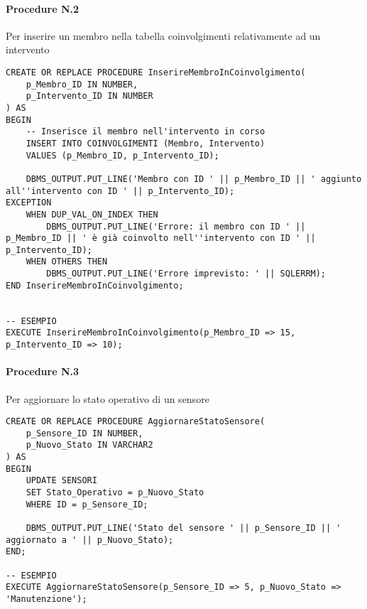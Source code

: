 \paragraph{Procedure N.2} Per inserire un membro nella tabella coinvolgimenti relativamente ad un intervento
\begin{lstlisting}
CREATE OR REPLACE PROCEDURE InserireMembroInCoinvolgimento(
    p_Membro_ID IN NUMBER,
    p_Intervento_ID IN NUMBER
) AS
BEGIN
    -- Inserisce il membro nell'intervento in corso
    INSERT INTO COINVOLGIMENTI (Membro, Intervento)
    VALUES (p_Membro_ID, p_Intervento_ID);
    
    DBMS_OUTPUT.PUT_LINE('Membro con ID ' || p_Membro_ID || ' aggiunto all''intervento con ID ' || p_Intervento_ID);
EXCEPTION
    WHEN DUP_VAL_ON_INDEX THEN
        DBMS_OUTPUT.PUT_LINE('Errore: il membro con ID ' || p_Membro_ID || ' è già coinvolto nell''intervento con ID ' || p_Intervento_ID);
    WHEN OTHERS THEN
        DBMS_OUTPUT.PUT_LINE('Errore imprevisto: ' || SQLERRM);
END InserireMembroInCoinvolgimento;


-- ESEMPIO
EXECUTE InserireMembroInCoinvolgimento(p_Membro_ID => 15, p_Intervento_ID => 10);    
\end{lstlisting} 
\vspace{1cm}

\paragraph{Procedure N.3} Per aggiornare lo stato operativo di un sensore
\begin{lstlisting}
CREATE OR REPLACE PROCEDURE AggiornareStatoSensore(
    p_Sensore_ID IN NUMBER,
    p_Nuovo_Stato IN VARCHAR2
) AS
BEGIN
    UPDATE SENSORI
    SET Stato_Operativo = p_Nuovo_Stato
    WHERE ID = p_Sensore_ID;
    
    DBMS_OUTPUT.PUT_LINE('Stato del sensore ' || p_Sensore_ID || ' aggiornato a ' || p_Nuovo_Stato);
END;

-- ESEMPIO
EXECUTE AggiornareStatoSensore(p_Sensore_ID => 5, p_Nuovo_Stato => 'Manutenzione');
\end{lstlisting}

